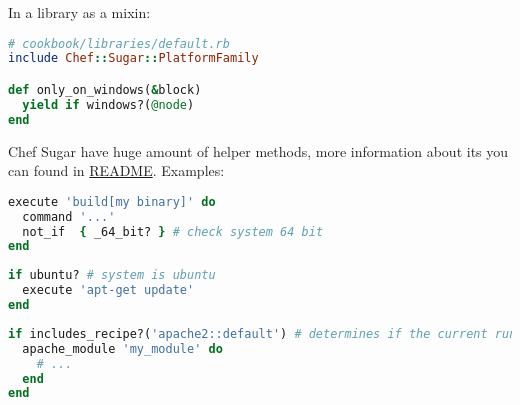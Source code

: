 In a library as a mixin:

\begin{lstlisting}[language=Ruby,label=lst:tat-chef-sugar5]
# cookbook/libraries/default.rb
include Chef::Sugar::PlatformFamily

def only_on_windows(&block)
  yield if windows?(@node)
end
\end{lstlisting}

Chef Sugar have huge amount of helper methods, more information about its you can found in \href{https://github.com/sethvargo/chef-sugar#api}{README}. Examples:

\begin{lstlisting}[language=Ruby,label=lst:tat-chef-sugar6]
execute 'build[my binary]' do
  command '...'
  not_if  { _64_bit? } # check system 64 bit
end
\end{lstlisting}

\begin{lstlisting}[language=Ruby,label=lst:tat-chef-sugar7]
if ubuntu? # system is ubuntu
  execute 'apt-get update'
end
\end{lstlisting}

\begin{lstlisting}[language=Ruby,label=lst:tat-chef-sugar8]
if includes_recipe?('apache2::default') # determines if the current run context includes the recipe
  apache_module 'my_module' do
    # ...
  end
end
\end{lstlisting}

